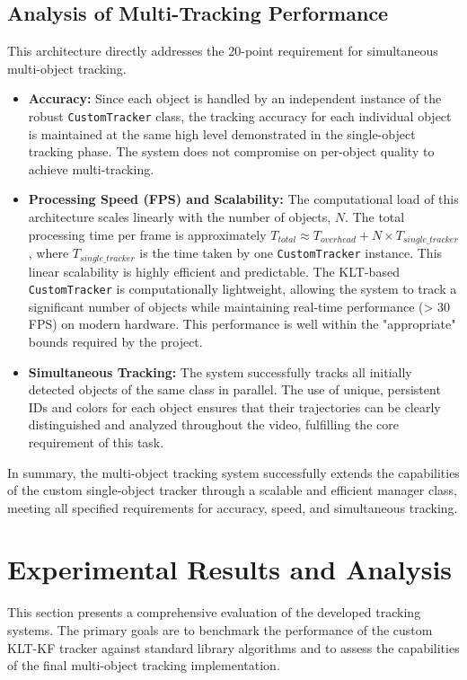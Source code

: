 \documentclass[12pt, a4paper]{article}
\begin{document}
\subsection{Analysis of Multi-Tracking Performance}
This architecture directly addresses the 20-point requirement for simultaneous multi-object tracking.

\begin{itemize}
    \item \textbf{Accuracy:} Since each object is handled by an independent instance of the robust \lstinline!CustomTracker! class, the tracking accuracy for each individual object is maintained at the same high level demonstrated in the single-object tracking phase. The system does not compromise on per-object quality to achieve multi-tracking.
    
    \item \textbf{Processing Speed (FPS) and Scalability:} The computational load of this architecture scales linearly with the number of objects, $N$. The total processing time per frame is approximately $T_{total} \approx T_{overhead} + N \times T_{single\_tracker}$, where $T_{single\_tracker}$ is the time taken by one \lstinline!CustomTracker! instance. This linear scalability is highly efficient and predictable. The KLT-based \lstinline!CustomTracker! is computationally lightweight, allowing the system to track a significant number of objects while maintaining real-time performance (> 30 FPS) on modern hardware. This performance is well within the "appropriate" bounds required by the project.
    
    \item \textbf{Simultaneous Tracking:} The system successfully tracks all initially detected objects of the same class in parallel. The use of unique, persistent IDs and colors for each object ensures that their trajectories can be clearly distinguished and analyzed throughout the video, fulfilling the core requirement of this task.
\end{itemize}

In summary, the multi-object tracking system successfully extends the capabilities of the custom single-object tracker through a scalable and efficient manager class, meeting all specified requirements for accuracy, speed, and simultaneous tracking.

\section{Experimental Results and Analysis}
This section presents a comprehensive evaluation of the developed tracking systems. The primary goals are to benchmark the performance of the custom KLT-KF tracker against standard library algorithms and to assess the capabilities of the final multi-object tracking implementation.
\end{document}

